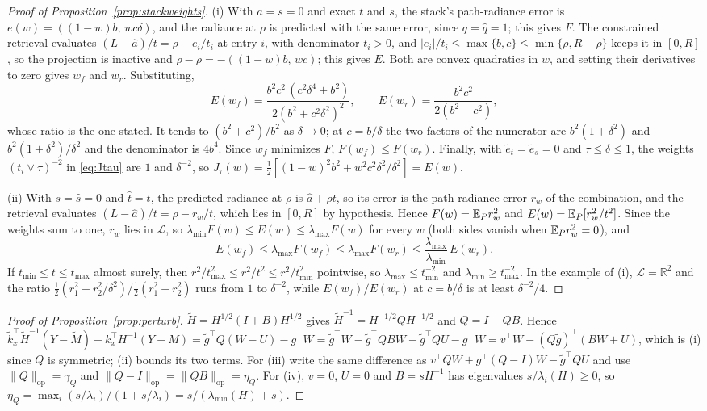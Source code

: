 \begin{proof}[Proof of Proposition~\ref{prop:stackweights}]
(i) With $a=s=0$ and exact $t$ and $s$, the stack's path-radiance error is
$e(w)=((1-w)b,\,wc\delta)$, and the radiance at $\rho$ is predicted with the same error, since
$q=\widehat q=1$; this gives $F$. The constrained retrieval evaluates
$(L-\widehat a)/t=\rho-e_i/t_i$ at entry $i$, with denominator $t_i>0$, and
$|e_i|/t_i\le\max\{b,c\}\le\min\{\rho,R-\rho\}$ keeps it in $[0,R]$, so the projection is inactive
and $\bar\rho-\rho=-((1-w)b,\,wc)$; this gives $E$. Both are convex quadratics in $w$, and setting
their derivatives to zero gives $w_f$ and $w_r$. Substituting,
\[
E(w_f)=\frac{b^2c^2\,(c^2\delta^4+b^2)}{2(b^2+c^2\delta^2)^2},\qquad
E(w_r)=\frac{b^2c^2}{2(b^2+c^2)},
\]
whose ratio is the one stated. It tends to $(b^2+c^2)/b^2$ as $\delta\to0$; at $c=b/\delta$ the
two factors of the numerator are $b^2(1+\delta^2)$ and $b^2(1+\delta^2)/\delta^2$ and the
denominator is $4b^4$. Since $w_f$ minimizes $F$, $F(w_f)\le F(w_r)$. Finally, with
$\widetilde e_t=\widetilde e_s=0$ and $\tau\le\delta\le1$, the weights $(t_i\vee\tau)^{-2}$ in
\eqref{eq:Jtau} are $1$ and $\delta^{-2}$, so $J_\tau(w)=\tfrac12[(1-w)^2b^2+w^2c^2\delta^2/\delta^2]=E(w)$.

(ii) With $s=\widehat s=0$ and $\widehat t=t$, the predicted radiance at $\rho$ is
$\widehat a+\rho t$, so its error is the path-radiance error $r_w$ of the combination, and the
retrieval evaluates $(L-\widehat a)/t=\rho-r_w/t$, which lies in $[0,R]$ by hypothesis. Hence
$F(w)=\mathbb{E}_Pr_w^2$ and $E(w)=\mathbb{E}_P[r_w^2/t^2]$. Since the weights sum to one, $r_w$ lies in
$\mathcal L$, so $\lambda_{\min}F(w)\le E(w)\le\lambda_{\max}F(w)$ for every $w$ (both sides vanish
when $\mathbb{E}_Pr_w^2=0$), and
\[
E(w_f)\le\lambda_{\max}F(w_f)\le\lambda_{\max}F(w_r)\le\frac{\lambda_{\max}}{\lambda_{\min}}\,E(w_r).
\]
If $t_{\min}\le t\le t_{\max}$ almost surely, then
$r^2/t_{\max}^2\le r^2/t^2\le r^2/t_{\min}^2$ pointwise, so $\lambda_{\max}\le t_{\min}^{-2}$ and
$\lambda_{\min}\ge t_{\max}^{-2}$. In the example of (i), $\mathcal L=\mathbb R^2$ and the ratio
$\tfrac12(r_1^2+r_2^2/\delta^2)/\tfrac12(r_1^2+r_2^2)$ runs from $1$ to $\delta^{-2}$, while
$E(w_f)/E(w_r)$ at $c=b/\delta$ is at least $\delta^{-2}/4$.
\end{proof}

\begin{proof}[Proof of Proposition~\ref{prop:perturb}]
$\widetilde H=H^{1/2}(I+B)H^{1/2}$ gives $\widetilde H^{-1}=H^{-1/2}QH^{-1/2}$ and $Q=I-QB$. Hence
$\widetilde k_x^{\top}\widetilde H^{-1}(Y-\widetilde M)-k_x^{\top}H^{-1}(Y-M)
=\widetilde g^{\top}Q(W-U)-g^{\top}W
=\widetilde g^{\top}W-\widetilde g^{\top}QBW-\widetilde g^{\top}QU-g^{\top}W
=v^{\top}W-(Q\widetilde g)^{\top}(BW+U)$, which is (i) since $Q$ is symmetric; (ii) bounds its two terms. For (iii)
write the same difference as $v^{\top}QW+g^{\top}(Q-I)W-\widetilde g^{\top}QU$ and use
$\|Q\|_{\mathrm{op}}=\gamma_Q$ and $\|Q-I\|_{\mathrm{op}}=\|QB\|_{\mathrm{op}}=\eta_Q$. For (iv), $v=0$, $U=0$ and
$B=sH^{-1}$ has eigenvalues $s/\lambda_i(H)\ge0$, so $\eta_Q=\max_i(s/\lambda_i)/(1+s/\lambda_i)=s/(\lambda_{\min}(H)+s)$.
\end{proof}

